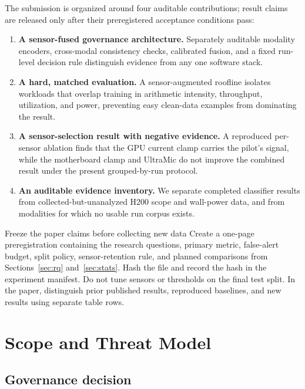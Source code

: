 \documentclass[sigplan,anonymous,review,nonacm]{acmart}
\begin{document}
The submission is organized around four auditable contributions; result claims are released only after their preregistered acceptance conditions pass:

\begin{enumerate}
  \item \textbf{A sensor-fused governance architecture.} Separately auditable modality encoders, cross-modal consistency checks, calibrated fusion, and a fixed run-level decision rule distinguish evidence from any one software stack.
  \item \textbf{A hard, matched evaluation.} A sensor-augmented roofline isolates workloads that overlap training in arithmetic intensity, throughput, utilization, and power, preventing easy clean-data examples from dominating the result.
  \item \textbf{A sensor-selection result with negative evidence.} A reproduced per-sensor ablation finds that the GPU current clamp carries the pilot's signal, while the motherboard clamp and UltraMic do not improve the combined result under the present grouped-by-run protocol.
  \item \textbf{An auditable evidence inventory.} We separate completed classifier results from collected-but-unanalyzed H200 scope and wall-power data, and from modalities for which no usable run corpus exists.
\end{enumerate}

\begin{experimentbox}{Freeze the paper claims before collecting new data}
Create a one-page preregistration containing the research questions, primary metric, false-alert budget, split policy, sensor-retention rule, and planned comparisons from Sections~\ref{sec:rq} and~\ref{sec:stats}. Hash the file and record the hash in the experiment manifest. Do not tune sensors or thresholds on the final test split. In the paper, distinguish prior published results, reproduced baselines, and new results using separate table rows.
\end{experimentbox}

\section{Scope and Threat Model}

\subsection{Governance decision}
\end{document}
